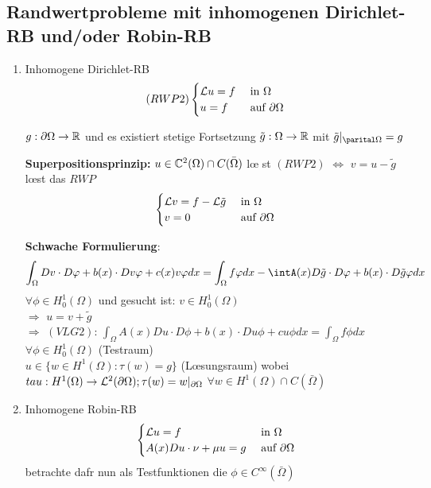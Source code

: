 \subsection{Randwertprobleme mit inhomogenen Dirichlet-RB und/oder Robin-RB}
\begin{enumerate}
  \item Inhomogene Dirichlet-RB\\
    \[
      (RWP2)\begin{cases}
      \mathcal{L} u=f & \mbox{ in }\Omega\\
      u=f & \mbox{ auf }\partial\Omega
      \end{cases}
    \]

    $g:\partial\Omega \rightarrow \mathbb{R}$ und es existiert stetige Fortsetzung
    $\tilde g:\Omega\rightarrow \mathbb{R}$ mit $\tilde g|_{\parital\Omega}=g$

    \textbf{Superpositionsprinzip:} $u\in\mathbb{C}^2(\Omega)\cap C(\bar\Omega)$ l\oe
    st $(RWP2)$ $\Leftrightarrow$
    $v=u-\tilde g$ l\oe st das $RWP$
    \[
      \begin{cases}
      \mathcal{L} v=f-\mathcal{L}\tilde g & \mbox{ in }\Omega\\
      v=0 & \mbox{ auf }\partial\Omega
      \end{cases}
    \]

    \textbf{Schwache Formulierung}:
    \[
      \int_\Omega Dv\cdot D\phi+b(x)\cdot Dv\phi +c(x)v\phi dx =\int_\Omega
      f\phi dx - \intA(x)D\tilde g \cdot D\phi + b(x)\cdot D\tilde g \phi dx
    \]
    $\forall \phi \in H^1_0(\Omega)$ und gesucht ist: $v\in H^1_0(\Omega)$\\
    $\Rightarrow$ $u=v+\tilde g$\\
    $\Rightarrow$ $(VLG 2)$: $\int_\Omega A(x)Du\cdot D\phi+b(x)\cdot Du \phi+
    cu\phi dx = \int_\Omega f\phi dx$ $\forall \phi\in H^1_0(\Omega)$
    (Testraum)\\
    $u\in \{ w\in H^1(\Omega) : \tau(w)=g \}$ (L\oe sungsraum) wobei
    $tau:H^1(\Omega)\rightarrow \mathcal{L}^2(\partial\Omega);
    \tau(w)=w|_{\partial\Omega}$ $\forall w\in H^1(\Omega)\cap C(\bar \Omega)$
  \item Inhomogene Robin-RB\\
    \[
      \begin{cases}
      \mathcal{L} u=f & \mbox{ in }\Omega\\
        A(x)Du\cdot \nu+\mu u=g & \mbox{ auf }\partial\Omega
      \end{cases}
    \]
    betrachte daf\ue r nun als Testfunktionen die $\phi\in C^\infty(\bar\Omega)$

\end{enumerate}

